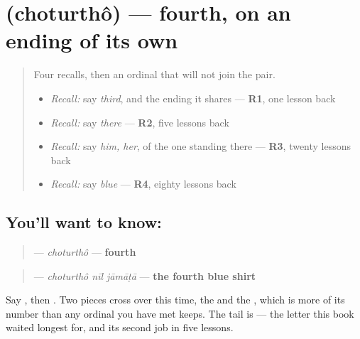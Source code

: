 \section[\texorpdfstring{\bn{চতুর্থ} (choturthô)}{চতুর্থ (choturthô)}]{ (choturthô) — fourth, on an ending of its own}

\label{lesson:BN-C27-choturtho}



\begin{quote}
Four recalls, then an ordinal that will not join the pair.

\begin{itemize}
\raggedright
  \item \emph{Recall:} say \emph{third}, and the ending it shares — \textbf{R1}, one lesson back
  \item \emph{Recall:} say \emph{there} — \textbf{R2}, five lessons back
  \item \emph{Recall:} say \emph{him, her}, of the one standing there — \textbf{R3}, twenty lessons back
  \item \emph{Recall:} say \emph{blue} — \textbf{R4}, eighty lessons back
\end{itemize}
\end{quote}

\subsection*{You'll want to know: }
\begin{quote}
\textbf{} — \emph{choturthô} — \textbf{fourth}
\end{quote}

\begin{quote}
\textbf{  } — \emph{choturthô nīl jāmāṭā} — \textbf{the fourth blue shirt}
\end{quote}

Say \textbf{}, then \textbf{}. Two pieces cross over this time, the \textbf{} and the \textbf{}, which is more of its number than any ordinal you have met keeps. The tail is \textbf{} — the letter this book waited longest for, and its second job in five lessons.

